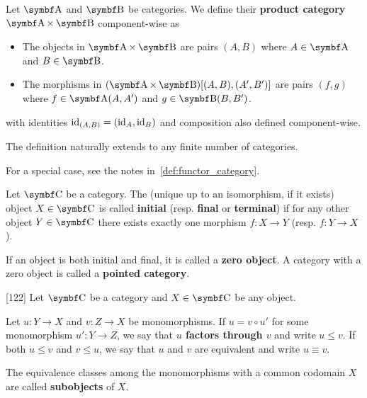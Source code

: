 \begin{definition}\label{def:product_category}\cite[exercise 1.1.14]{Leinster2014}
  Let \( \Bold A \) and \( \Bold B \) be categories. We define their \textbf{product category} \( \Bold A \times \Bold B \) component-wise as
  \begin{itemize}
    \item The objects in \( \Bold A \times \Bold B \) are pairs \( (A, B) \) where \( A \in \Bold A \) and \( B \in \Bold B \).
    \item The morphisms in \( (\Bold A \times \Bold B)[(A, B), (A', B')] \) are pairs \( (f, g) \) where \( f \in \Bold{A}(A, A') \) and \( g \in \Bold{B}(B, B') \).
  \end{itemize}
  with identities \( \operatorname{id}_{(A,B)} =(\operatorname{id}_A, \operatorname{id}_B) \) and composition also defined component-wise.

  The definition naturally extends to any finite number of categories.

  For a special case, see the notes in~\cref{def:functor_category}.
\end{definition}

\begin{definition}\label{def:initial_final_objects}\cite[definitions 2.1.7]{Leinster2014}
  Let \( \Bold C \) be a category. The (unique up to an isomorphism, if it exists) object \( X \in \Bold C \) is called \textbf{initial} (resp. \textbf{final} or \textbf{terminal}) if for any other object \( Y \in \Bold C \) there exists exactly one morphism \( f: X \to Y \) (resp. \( f: Y \to X \)).

  If an object is both initial and final, it is called a \textbf{zero object}. A category with a zero object is called a \textbf{pointed category}.
\end{definition}

\begin{definition}\label{def:categorical_subobject}\cite{MacLane1994}[122]
  Let \( \Bold C \) be a category and \( X \in \Bold C \) be any object.

  Let \( u: Y \to X \) and \( v: Z \to X \) be monomorphisms. If \( u = v \circ u' \) for some monomorphism \( u': Y \to Z \), we say that \textbf{\( u \) factors through \( v \)} and write \( u \leq v \). If both \( u \leq v \) and \( v \leq u \), we say that \( u \) and \( v \) are equivalent and write \( u \equiv v \).

  The equivalence classes among the monomorphisms with a common codomain \( X \) are called \textbf{subobjects} of \( X \).
\end{definition}

